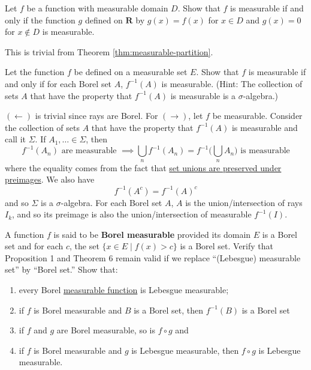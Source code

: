   \begin{exercise}[Royden 3.6]
    Let $f$ be a function with measurable domain $D$. Show that $f$ is measurable if and only if the function $g$ defined on $\mathbf{R}$ by $g(x) = f(x)$ for $x \in D$ and $g(x) = 0$ for $x \notin D$ is measurable.
  \end{exercise}
  \begin{solution}
    This is trivial from Theorem \ref{thm:measurable-partition}. 
  \end{solution}

  \begin{exercise}[Royden 3.7]
    Let the function $f$ be defined on a measurable set $E$. Show that $f$ is measurable if and only if for each Borel set $A$, $f^{-1}(A)$ is measurable. (Hint: The collection of sets $A$ that have the property that $f^{-1}(A)$ is measurable is a $\sigma$-algebra.)
  \end{exercise}
  \begin{solution}
    $(\leftarrow)$ is trivial since rays are Borel. For $(\rightarrow)$, let $f$ be measurable. Consider the collection of sets $A$ that have the property that $f^{-1}(A)$ is measurable and call it $\Sigma$. If $A_1, \ldots \in \Sigma$, then 
    \begin{equation}
      f^{-1} (A_n) \text{ are measurable } \implies \bigcup_n f^{-1} (A_n) = f^{-1} \bigg( \bigcup_n A_n \bigg) \text{ is measurable}
    \end{equation}
    where the equality comes from the fact that \hyperref[st-thm:preserve_preimage]{set unions are preserved under preimages}. We also have 
    \begin{equation}
      f^{-1} (A^c) = f^{-1} (A)^c
    \end{equation}
    and so $\Sigma$ is a $\sigma$-algebra. For each Borel set $A$, $A$ is the union/intersection of rays $I_k$, and so its preimage is also the union/intersection of measurable $f^{-1} (I)$. 
  \end{solution}

  \begin{exercise}[Royden 3.8]
    A function $f$ is said to be \textbf{Borel measurable} provided its domain $E$ is a Borel set and for each $c$, the set $\{x \in E \mid f(x) > c\}$ is a Borel set. Verify that Proposition 1 and Theorem 6 remain valid if we replace ``(Lebesgue) measurable set'' by ``Borel set.'' Show that: 
    \begin{enumerate}
      \item every Borel \hyperref[def:measurable-function]{measurable function} is Lebesgue measurable; 
      \item if $f$ is Borel measurable and $B$ is a Borel set, then $f^{-1}(B)$ is a Borel set
      \item if $f$ and $g$ are Borel measurable, so is $f \circ g$ and 
      \item if $f$ is Borel measurable and $g$ is Lebesgue measurable, then $f \circ g$ is Lebesgue measurable.
    \end{enumerate}
  \end{exercise}


